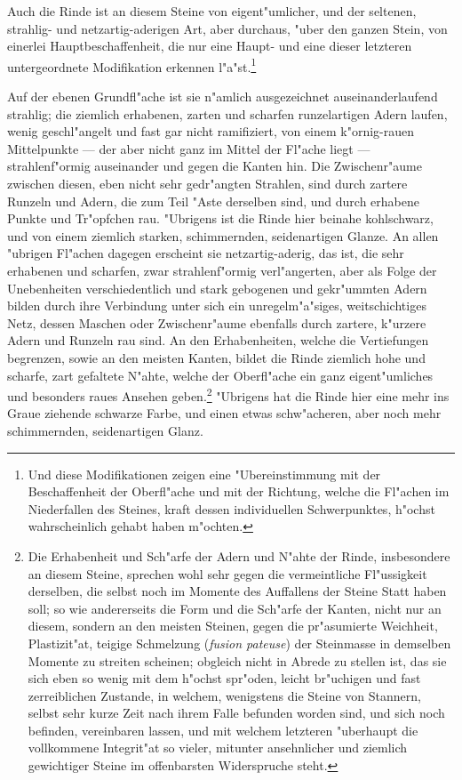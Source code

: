\documentclass[a4paper, 11pt, oneside, german]{article}
\begin{document}
Auch die Rinde ist an diesem Steine von eigent"umlicher, und der seltenen, strahlig- und netzartig-aderigen Art, aber durchaus, "uber den ganzen Stein, von einerlei Hauptbeschaffenheit, die nur eine Haupt- und eine dieser letzteren untergeordnete Modifikation erkennen l"a"st.\footnote{Und diese Modifikationen zeigen eine "Ubereinstimmung mit der Beschaffenheit der Oberfl"ache und mit der Richtung, welche die Fl"achen im Niederfallen des Steines, kraft dessen individuellen Schwerpunktes, h"ochst wahrscheinlich gehabt haben m"ochten.}

Auf der ebenen Grundfl"ache ist sie n"amlich ausgezeichnet auseinanderlaufend strahlig; die ziemlich erhabenen, zarten und scharfen runzelartigen Adern laufen, wenig geschl"angelt und fast gar nicht ramifiziert, von einem k"ornig-rauen Mittelpunkte --- der aber nicht ganz im Mittel der Fl"ache liegt --- strahlenf"ormig auseinander und gegen die Kanten hin. Die Zwischenr"aume zwischen diesen, eben nicht sehr gedr"angten Strahlen, sind durch zartere Runzeln und Adern, die zum Teil "Aste derselben sind, und durch erhabene Punkte und Tr"opfchen rau. "Ubrigens ist die Rinde hier beinahe kohlschwarz, und von einem ziemlich starken, schimmernden, seidenartigen Glanze. An allen "ubrigen Fl"achen dagegen erscheint sie netzartig-aderig, das ist, die sehr erhabenen und scharfen, zwar strahlenf"ormig verl"angerten, aber als Folge der Unebenheiten verschiedentlich und stark gebogenen und gekr"ummten Adern bilden durch ihre Verbindung unter sich ein unregelm"a"siges, weitschichtiges Netz, dessen Maschen oder Zwischenr"aume ebenfalls durch zartere, k"urzere Adern und Runzeln rau sind. An den Erhabenheiten, welche die Vertiefungen begrenzen, sowie an den meisten Kanten, bildet die Rinde ziemlich hohe und scharfe, zart gefaltete N"ahte, welche der Oberfl"ache ein ganz eigent"umliches und besonders raues Ansehen geben.\footnote{Die Erhabenheit und Sch"arfe der Adern und N"ahte der Rinde, insbesondere an diesem Steine, sprechen wohl sehr gegen die vermeintliche Fl"ussigkeit derselben, die selbst noch im Momente des Auffallens der Steine Statt haben soll; so wie andererseits die Form und die Sch"arfe der Kanten, nicht nur an diesem, sondern an den meisten Steinen, gegen die pr"asumierte Weichheit, Plastizit"at, teigige Schmelzung (\emph{fusion pateuse}) der Steinmasse in demselben Momente zu streiten scheinen; obgleich nicht in Abrede zu stellen ist, das sie sich eben so wenig mit dem h"ochst spr"oden, leicht br"uchigen und fast zerreiblichen Zustande, in welchem, wenigstens die Steine von Stannern, selbst sehr kurze Zeit nach ihrem Falle befunden worden sind, und sich noch befinden, vereinbaren lassen, und mit welchem letzteren "uberhaupt die vollkommene Integrit"at so vieler, mitunter ansehnlicher und ziemlich gewichtiger Steine im offenbarsten Widerspruche steht.} "Ubrigens hat die Rinde hier eine mehr ins Graue ziehende schwarze Farbe, und einen etwas schw"acheren, aber noch mehr schimmernden, seidenartigen Glanz.
\end{document}
